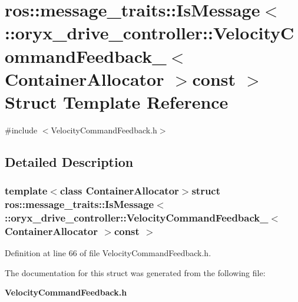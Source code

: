 \section{ros\-:\-:message\-\_\-traits\-:\-:\-Is\-Message$<$ \-:\-:oryx\-\_\-drive\-\_\-controller\-:\-:\-Velocity\-Command\-Feedback\-\_\-$<$ \-Container\-Allocator $>$const $>$ \-Struct \-Template \-Reference}
\label{structros_1_1message__traits_1_1IsMessage_3_01_1_1oryx__drive__controller_1_1VelocityCommandFeed37e0fa4e76135c2cf49a94e867c5b4a5}


{\ttfamily \#include $<$\-Velocity\-Command\-Feedback.\-h$>$}



\subsection{\-Detailed \-Description}
\subsubsection*{template$<$class Container\-Allocator$>$struct ros\-::message\-\_\-traits\-::\-Is\-Message$<$ \-::oryx\-\_\-drive\-\_\-controller\-::\-Velocity\-Command\-Feedback\-\_\-$<$ Container\-Allocator $>$const  $>$}



\-Definition at line 66 of file \-Velocity\-Command\-Feedback.\-h.



\-The documentation for this struct was generated from the following file\-:\begin{DoxyCompactItemize}
\item 
{\bf \-Velocity\-Command\-Feedback.\-h}\end{DoxyCompactItemize}
